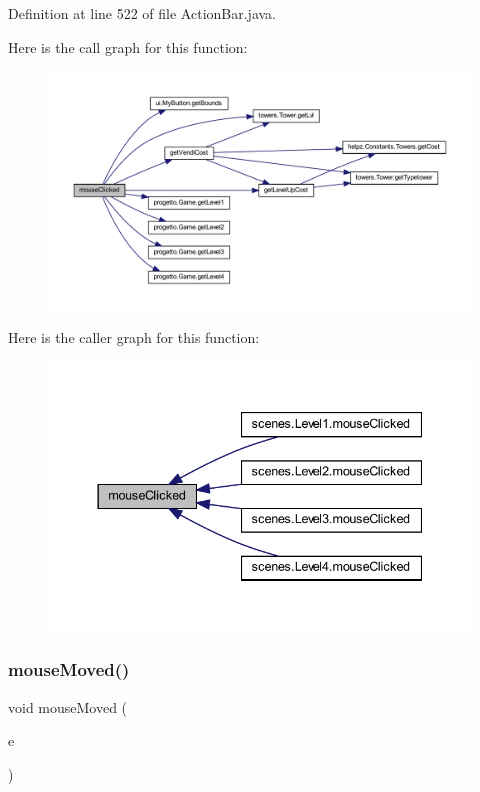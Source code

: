 Definition at line 522 of file Action\+Bar.\+java.

Here is the call graph for this function\+:\nopagebreak
\begin{figure}[H]
\begin{center}
\leavevmode
\includegraphics[width=350pt]{classui_1_1_action_bar_a45d56bd84238e8b56589dfc732e2b2cf_cgraph}
\end{center}
\end{figure}
Here is the caller graph for this function\+:\nopagebreak
\begin{figure}[H]
\begin{center}
\leavevmode
\includegraphics[width=337pt]{classui_1_1_action_bar_a45d56bd84238e8b56589dfc732e2b2cf_icgraph}
\end{center}
\end{figure}
\mbox{\label{classui_1_1_action_bar_a2ca251710b65639ec80bc141edde60aa}} 
\subsubsection{\texorpdfstring{mouse\+Moved()}{mouseMoved()}}
{\footnotesize\ttfamily void mouse\+Moved (\begin{DoxyParamCaption}\item[{Mouse\+Event}]{e }\end{DoxyParamCaption})}



